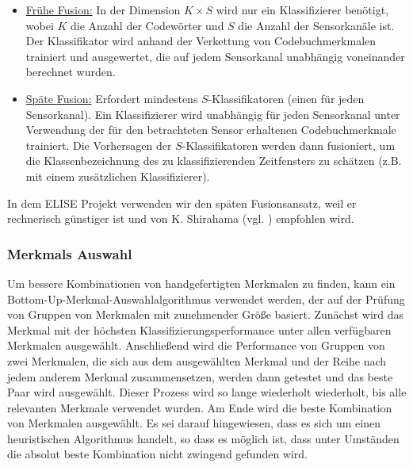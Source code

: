 \begin{itemize}
  \item \underline{Frühe Fusion:} In der Dimension $K \times S$ wird nur ein Klassifizierer benötigt, wobei $K$ die Anzahl der Codewörter und $S$ die Anzahl der Sensorkanäle ist. Der Klassifikator wird anhand der Verkettung von Codebuchmerkmalen trainiert und ausgewertet, die auf jedem Sensorkanal unabhängig voneinander berechnet wurden.

  \item \underline{Späte Fusion:} Erfordert mindestens $S$-Klassifikatoren (einen für jeden Sensorkanal). Ein Klassifizierer wird unabhängig für jeden Sensorkanal unter Verwendung der für den betrachteten Sensor erhaltenen Codebuchmerkmale trainiert. Die Vorhersagen der $S$-Klassifikatoren werden dann fusioniert, um die Klassenbezeichnung des zu klassifizierenden Zeitfensters zu schätzen (z.B. mit einem zusätzlichen Klassifizierer).
\end{itemize} \vspace{0.5cm}


In dem ELISE Projekt verwenden wir den späten Fusionsansatz, weil er rechnerisch günstiger ist und von K. Shirahama (vgl. \cite{kimiaki_codebook_approach_2016}) empfohlen wird. \\



\subsubsection{Merkmals Auswahl} \label{featureSelection-1}

Um bessere Kombinationen von handgefertigten Merkmalen zu finden, kann ein Bottom-Up-Merkmal-Auswahlalgorithmus verwendet werden, der auf der Prüfung von Gruppen von Merkmalen mit zunehmender Größe basiert.
Zunächst wird das Merkmal mit der höchsten Klassifizierungsperformance unter allen verfügbaren Merkmalen ausgewählt. 
Anschließend wird die Performance von Gruppen von zwei Merkmalen, die sich aus dem ausgewählten Merkmal und der Reihe nach jedem anderem Merkmal zusammensetzen, werden dann getestet und das beste Paar wird ausgewählt. 
Dieser Prozess wird so lange wiederholt wiederholt, bis alle relevanten Merkmale verwendet wurden. 
Am Ende wird die beste Kombination von Merkmalen ausgewählt.
Es sei darauf hingewiesen, dass es sich um einen heuristischen Algorithmus handelt, so dass es möglich ist, dass unter Umständen die absolut beste Kombination nicht zwingend gefunden wird. \\


